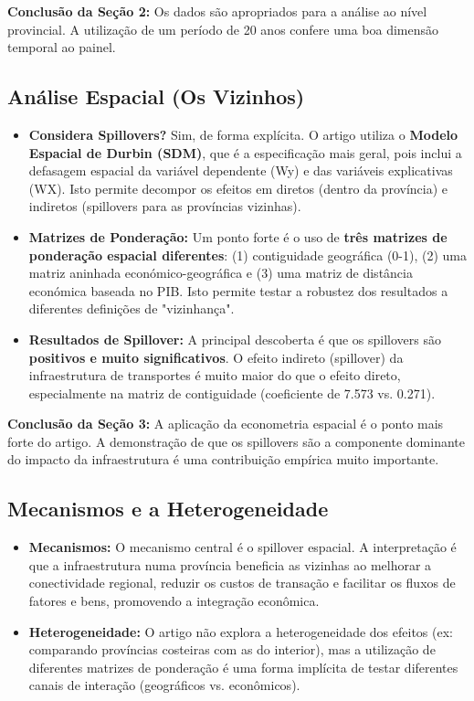 \documentclass[12pt, a4paper]{article}
\begin{document}
\noindent\textbf{Conclusão da Seção 2:} Os dados são apropriados para a análise ao nível provincial. A utilização de um período de 20 anos confere uma boa dimensão temporal ao painel.

\subsection{Análise Espacial (Os Vizinhos)}

\begin{itemize}
    \item \textbf{Considera Spillovers?} Sim, de forma explícita. O artigo utiliza o \textbf{Modelo Espacial de Durbin (SDM)}, que é a especificação mais geral, pois inclui a defasagem espacial da variável dependente (Wy) e das variáveis explicativas (WX). Isto permite decompor os efeitos em diretos (dentro da província) e indiretos (spillovers para as províncias vizinhas).
    \item \textbf{Matrizes de Ponderação:} Um ponto forte é o uso de \textbf{três matrizes de ponderação espacial diferentes}: (1) contiguidade geográfica (0-1), (2) uma matriz aninhada económico-geográfica e (3) uma matriz de distância económica baseada no PIB. Isto permite testar a robustez dos resultados a diferentes definições de "vizinhança".
    \item \textbf{Resultados de Spillover:} A principal descoberta é que os spillovers são \textbf{positivos e muito significativos}. O efeito indireto (spillover) da infraestrutura de transportes é muito maior do que o efeito direto, especialmente na matriz de contiguidade (coeficiente de 7.573 vs. 0.271).
\end{itemize}

\noindent\textbf{Conclusão da Seção 3:} A aplicação da econometria espacial é o ponto mais forte do artigo. A demonstração de que os spillovers são a componente dominante do impacto da infraestrutura é uma contribuição empírica muito importante.

\subsection{Mecanismos e a Heterogeneidade}

\begin{itemize}
    \item \textbf{Mecanismos:} O mecanismo central é o spillover espacial. A interpretação é que a infraestrutura numa província beneficia as vizinhas ao melhorar a conectividade regional, reduzir os custos de transação e facilitar os fluxos de fatores e bens, promovendo a integração econômica.
    \item \textbf{Heterogeneidade:} O artigo não explora a heterogeneidade dos efeitos (ex: comparando províncias costeiras com as do interior), mas a utilização de diferentes matrizes de ponderação é uma forma implícita de testar diferentes canais de interação (geográficos vs. econômicos).
\end{itemize}
\end{document}
